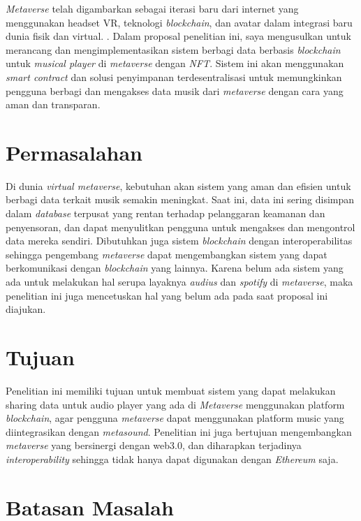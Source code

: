 \emph{Metaverse} telah digambarkan sebagai iterasi baru dari internet yang menggunakan headset VR, teknologi \emph{blockchain},
dan avatar dalam integrasi baru dunia fisik dan virtual. \parencite{DWIVEDI2022102542}. Dalam proposal penelitian ini, saya mengusulkan
untuk merancang dan mengimplementasikan sistem berbagi data berbasis \emph{blockchain}
untuk \emph{musical player} di \emph{metaverse} dengan \emph{NFT}. Sistem ini akan menggunakan \emph{smart contract} dan solusi penyimpanan terdesentralisasi
untuk memungkinkan pengguna berbagi dan mengakses data musik dari \emph{metaverse} dengan cara yang aman dan transparan.

\lipsum[2]

\section{Permasalahan}
\label{sec:permasalahan}

Di dunia \emph{virtual metaverse}, kebutuhan akan sistem yang aman dan efisien untuk berbagi data terkait musik semakin meningkat.
Saat ini, data ini sering disimpan dalam \emph{database} terpusat yang rentan terhadap pelanggaran keamanan dan
penyensoran, dan dapat menyulitkan pengguna untuk mengakses dan mengontrol data mereka sendiri. Dibutuhkan juga sistem \emph{blockchain} dengan interoperabilitas sehingga
pengembang \emph{metaverse} dapat mengembangkan sistem yang dapat berkomunikasi dengan \emph{blockchain} yang lainnya. Karena belum ada sistem yang ada untuk melakukan
hal serupa layaknya \emph{audius} dan \emph{spotify} di \emph{metaverse},
maka penelitian ini juga mencetuskan hal yang belum ada pada saat proposal ini diajukan.

\section{Tujuan}
\label{sec:Tujuan}

Penelitian ini memiliki tujuan untuk membuat sistem yang
dapat melakukan sharing data untuk audio player yang ada
di \emph{Metaverse} menggunakan platform \emph{blockchain}, agar
pengguna \emph{metaverse} dapat menggunakan platform music
yang diintegrasikan dengan \emph{metasound}. Penelitian ini juga bertujuan mengembangkan \emph{metaverse} yang
bersinergi dengan web3.0, dan diharapkan terjadinya \emph{interoperability} sehingga tidak hanya dapat digunakan
dengan \emph{Ethereum} saja.

\section{Batasan Masalah}
\label{sec:batasanmasalah}

